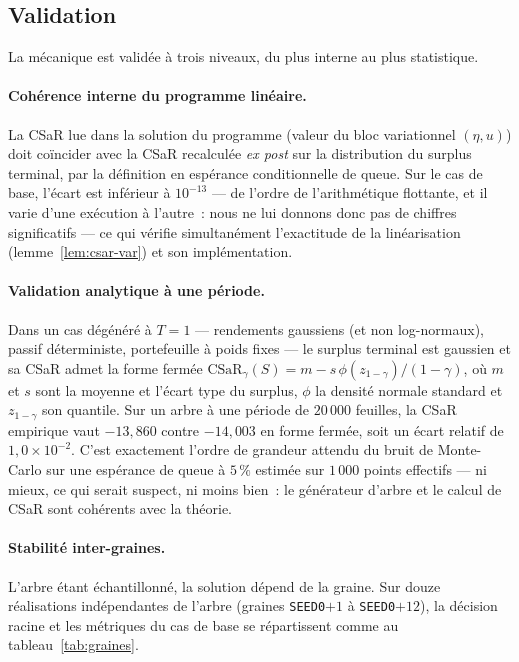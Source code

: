 \documentclass[11pt,letterpaper]{article}
\newcommand{\CSaR}{\mathrm{CSaR}}
\theoremstyle{definition}
\begin{document}
\subsection{Validation}\label{ssec:validation}

La mécanique est validée à trois niveaux, du plus interne au plus statistique.

\paragraph{Cohérence interne du programme linéaire.}
La CSaR lue dans la solution du programme (valeur du bloc variationnel
$(\eta, u)$) doit coïncider avec la CSaR recalculée \emph{ex post} sur la
distribution du surplus terminal, par la définition en espérance conditionnelle
de queue. Sur le cas de base, l'écart est inférieur à $10^{-13}$ --- de
l'ordre de l'arithmétique flottante, et il varie d'une exécution à l'autre~:
nous ne lui donnons donc pas de chiffres significatifs --- ce qui vérifie simultanément
l'exactitude de la linéarisation (lemme~\ref{lem:csar-var}) et son
implémentation.

\paragraph{Validation analytique à une période.}
Dans un cas dégénéré à $T = 1$ --- rendements gaussiens (et non log-normaux),
passif déterministe, portefeuille à poids fixes --- le surplus terminal est
gaussien et sa CSaR admet la forme fermée
$\CSaR_\gamma(S) = m - s\,\phi(z_{1-\gamma})/(1-\gamma)$, où $m$ et $s$ sont la
moyenne et l'écart type du surplus, $\phi$ la densité normale standard et
$z_{1-\gamma}$ son quantile. Sur un arbre à une période de $20\,000$ feuilles,
la CSaR empirique vaut $-13{,}860$ contre $-14{,}003$ en forme fermée, soit un
écart relatif de $1{,}0 \times 10^{-2}$. C'est exactement l'ordre de grandeur
attendu du bruit de Monte-Carlo sur une espérance de queue à $5\,\%$ estimée
sur $1\,000$ points effectifs --- ni mieux, ce qui serait suspect, ni moins
bien~: le générateur d'arbre et le calcul de CSaR sont cohérents avec la
théorie.

\paragraph{Stabilité inter-graines.}
L'arbre étant échantillonné, la solution dépend de la graine. Sur douze
réalisations indépendantes de l'arbre (graines \texttt{SEED0}$+1$ à
\texttt{SEED0}$+12$), la décision racine et les métriques du cas de base se
répartissent comme au tableau~\ref{tab:graines}.
\end{document}
